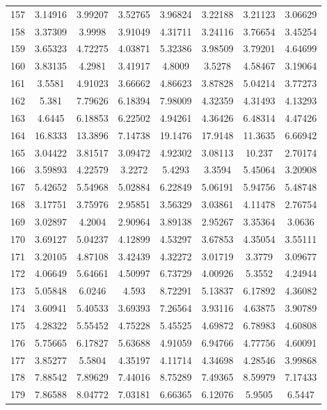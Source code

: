 \begin{center}
\begin{longtable}{cccccccc}
157 & 3.14916 & 3.99207 & 3.52765 & 3.96824 & 3.22188 & 3.21123 & 3.06629\\
158 & 3.37309 & 3.9998 & 3.91049 & 4.31711 & 3.24116 & 3.76654 & 3.45254\\
159 & 3.65323 & 4.72275 & 4.03871 & 5.32386 & 3.98509 & 3.79201 & 4.64699\\
160 & 3.83135 & 4.2981 & 3.41917 & 4.8009 & 3.5278 & 4.58467 & 3.19064\\
161 & 3.5581 & 4.91023 & 3.66662 & 4.86623 & 3.87828 & 5.04214 & 3.77273\\
162 & 5.381 & 7.79626 & 6.18394 & 7.98009 & 4.32359 & 4.31493 & 4.13293\\
163 & 4.6445 & 6.18853 & 6.22502 & 4.94261 & 4.36426 & 6.48314 & 4.47426\\
164 & 16.8333 & 13.3896 & 7.14738 & 19.1476 & 17.9148 & 11.3635 & 6.66942\\
165 & 3.04422 & 3.81517 & 3.09472 & 4.92302 & 3.08113 & 10.237 & 2.70174\\
166 & 3.59893 & 4.22579 & 3.2272 & 5.4293 & 3.3594 & 5.45064 & 3.20908\\
167 & 5.42652 & 5.54968 & 5.02884 & 6.22849 & 5.06191 & 5.94756 & 5.48748\\
168 & 3.17751 & 3.75976 & 2.95851 & 3.56329 & 3.03861 & 4.11478 & 2.76754\\
169 & 3.02897 & 4.2004 & 2.90964 & 3.89138 & 2.95267 & 3.35364 & 3.0636\\
170 & 3.69127 & 5.04237 & 4.12899 & 4.53297 & 3.67853 & 4.35054 & 3.55111\\
171 & 3.20105 & 4.87108 & 3.42439 & 4.32272 & 3.01719 & 3.3779 & 3.09677\\
172 & 4.06649 & 5.64661 & 4.50997 & 6.73729 & 4.00926 & 5.3552 & 4.24944\\
173 & 5.05848 & 6.0246 & 4.593 & 8.72291 & 5.13837 & 6.17892 & 4.36082\\
174 & 3.60941 & 5.40533 & 3.69393 & 7.26564 & 3.93116 & 4.63875 & 3.90789\\
175 & 4.28322 & 5.55452 & 4.75228 & 5.45525 & 4.69872 & 6.78983 & 4.60808\\
176 & 5.75665 & 6.17827 & 5.63688 & 4.91059 & 6.94766 & 4.77756 & 4.60091\\
177 & 3.85277 & 5.5804 & 4.35197 & 4.11714 & 4.34698 & 4.28546 & 3.99868\\
178 & 7.88542 & 7.89629 & 7.44016 & 8.75289 & 7.49365 & 8.59979 & 7.17433\\
179 & 7.86588 & 8.04772 & 7.03181 & 6.66365 & 6.12076 & 5.9505 & 6.5447\\

\end{longtable}
\end{center}
